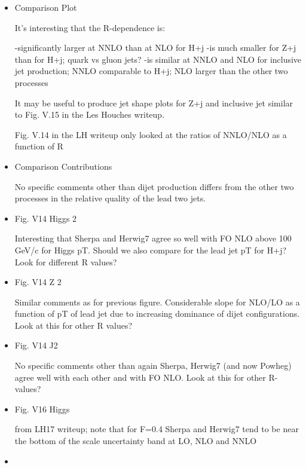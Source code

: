 \documentclass[aps,prd,onecolumn,fleqn,superscriptaddress,groupedaddress,nofootinbib,preprintnumbers,nobalancelastpage]{revtex4}
\begin{document}
\begin{itemize}
 
 \item 

Comparison Plot

It’s interesting that the R-dependence is:

-significantly larger at NNLO than at NLO for H+j
-is much smaller for Z+j than for H+j; quark vs gluon jets? 
-is similar at NNLO and NLO for inclusive jet production; NNLO comparable to H+j; NLO larger than the other two processes

It may be useful to produce jet shape plots for Z+j and inclusive jet similar to Fig. V.15 in the Les Houches writeup. 

Fig. V.14 in the LH writeup only looked at the ratios of NNLO/NLO as a function of R

\item 

Comparison Contributions

No specific comments other than dijet production differs from the other two processes in the relative quality of the lead two jets. 

\item

Fig. V14 Higgs 2

Interesting that Sherpa and Herwig7 agree so well with FO NLO  above 100 GeV/c for Higgs pT. Should we also compare for the lead jet pT for H+j? Look for different R values? 

\item 

Fig. V14 Z 2

Similar comments as for previous figure. Considerable slope for NLO/LO as a function of pT of lead jet due to increasing dominance of dijet configurations. Look at this for other R values? 

\item

Fig. V14 J2

No specific comments other than again Sherpa, Herwig7 (and now Powheg) agree well with each other and with FO NLO. Look at this for other R-values?

\item

Fig. V16 Higgs

from LH17 writeup; note that for F=0.4 Sherpa and Herwig7 tend to be near the bottom of the scale uncertainty band at LO, NLO and NNLO

\item 


\end{itemize}
\end{document}
